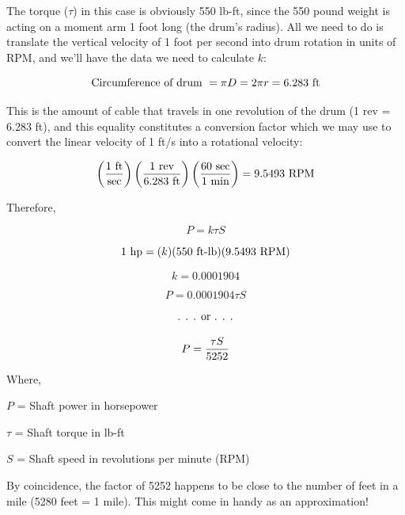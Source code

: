 





The torque ($\tau$) in this case is obviously 550 lb-ft, since the 550 pound weight is acting on a moment arm 1 foot long (the drum's radius).  All we need to do is translate the vertical velocity of 1 foot per second into drum rotation in units of RPM, and we'll have the data we need to calculate $k$:

\vskip 10pt

$$\hbox{Circumference of drum } = \pi D = 2 \pi r = 6.283 \hbox{ ft}$$

This is the amount of cable that travels in one revolution of the drum (1 rev = 6.283 ft), and this equality constitutes a conversion factor which we may use to convert the linear velocity of 1 ft/s into a rotational velocity:

\vskip 10pt

$$\left({{1 \hbox{ ft}} \over \hbox{sec}} \right)  \left({{1 \hbox{ rev}} \over {6.283 \hbox{ ft}}}\right) \left( {{60 \hbox{ sec}} \over {1 \hbox{ min}}} \right) = 9.5493 \hbox{ RPM}$$

Therefore, 

$$P = k \tau S$$

$$1 \hbox{ hp}  = (k) (550 \hbox{ ft-lb}) (9.5493 \hbox{ RPM})$$

$$k = 0.0001904$$

$$P = 0.0001904 \tau S$$

$$\hbox{. . . or . . .}$$

$$P = {{\tau S} \over 5252}$$

\noindent
Where,

$P$ = Shaft power in horsepower

$\tau$ = Shaft torque in lb-ft

$S$ = Shaft speed in revolutions per minute (RPM)

\vskip 10pt

By coincidence, the factor of 5252 happens to be close to the number of feet in a mile (5280 feet = 1 mile).  This might come in handy as an approximation!











